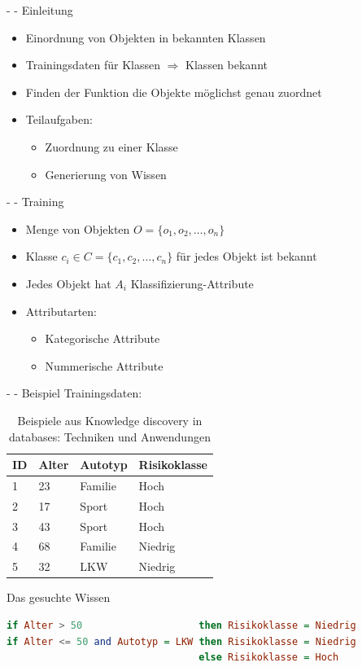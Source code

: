 \documentclass[fleqn,11pt,aspectratio=43]{beamer}
\begin{document}
\begin{frame}{\insertsectionhead - \insertsubsectionhead - Einleitung \cite{ester2000knowledge}}
\begin{itemize}
\item Einordnung von Objekten in bekannten Klassen
\item Trainingsdaten für Klassen $\Rightarrow$ Klassen bekannt
\item Finden der Funktion die Objekte möglichst genau zuordnet
\item Teilaufgaben:
\begin{itemize}
\item Zuordnung zu einer Klasse
\item Generierung von Wissen 
\end{itemize}
\end{itemize}
\end{frame}

\begin{frame}{\insertsectionhead - \insertsubsectionhead - Training \cite{ester2000knowledge}}
\begin{itemize}
\item Menge von Objekten $O = \{o_1, o_2, \ldots, o_n\}$
\item Klasse $c_i \in C = \{c_1, c_2, \ldots, c_n\}$ für jedes Objekt ist bekannt
\item Jedes Objekt hat $A_i$ Klassifizierung-Attribute
\item Attributarten:
\begin{itemize}
\item Kategorische Attribute
\item Nummerische Attribute
\end{itemize}
\end{itemize}
\end{frame}

\begin{frame}[fragile]{\insertsectionhead - \insertsubsectionhead - Beispiel \cite{ester2000knowledge}}
Trainingsdaten:
\begin{table}
\begin{tabular}{|p{2cm}|p{2cm}|p{2cm}|p{2cm}|}\hline
ID 	& Alter	& Autotyp	& Risikoklasse \\\hline \hline
1	& 23	& Familie	& Hoch\\
2	& 17	& Sport		& Hoch\\
3	& 43	& Sport		& Hoch\\
4	& 68	& Familie	& Niedrig\\
5	& 32	& LKW		& Niedrig \\\hline
\end{tabular}
\caption{Beispiele aus Knowledge discovery in databases: Techniken und Anwendungen \cite{ester2000knowledge}}
\end{table}
\pause
Das gesuchte Wissen
\begin{lstlisting}[language=Haskell]
if Alter > 50                    then Risikoklasse = Niedrig
if Alter <= 50 and Autotyp = LKW then Risikoklasse = Niedrig
                                 else Risikoklasse = Hoch
\end{lstlisting}
\end{frame}
\end{document}

